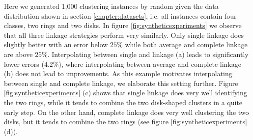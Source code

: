 Here we generated 1,000 clustering instances by random given the data distribution shown in section \ref{chapter:datasets}, i.e. all instances contain four classes, two rings and two disks. In figure \ref{fig:syntheticexperiments} we observe that all three linkage strategies perform very similarly. Only single linkage does slightly better with an error below $25\%$ while both average and complete linkage are above $25\%$. Interpolating between single and linkage (a) leads to significantly lower errors ($4.2\%$), where interpolating between average and complete linkage (b) does not lead to improvements. As this example motivates interpolating between single and complete linkage, we elaborate this setting further. Figure \ref{fig:syntheticexperiments} (c) shows that single linkage does very well identifying the two rings, while it tends to combine the two disk-shaped clusters in a quite early step. On the other hand, complete linkage does very well clustering the two disks, but it tends to combine the two rings (see figure \ref{fig:syntheticexperiments} (d)).

